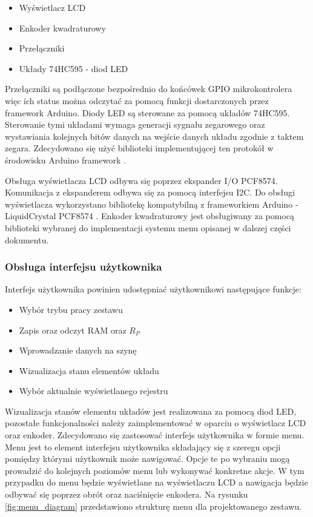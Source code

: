 \documentclass[../main.tex]{subfiles}
\begin{document}
    \begin{itemize}
        \item Wyświetlacz LCD
        \item Enkoder kwadraturowy
        \item Przełączniki
        \item Układy 74HC595 - diod LED
    \end{itemize}
    Przełączniki są podłączone bezpośrednio do końcówek GPIO mikrokontrolera więc ich status można odczytać za pomocą funkcji
    dostarczonych przez framework Arduino. Diody LED są sterowane za pomocą układów 74HC595. Sterowanie tymi układami wymaga 
    generacji sygnału zegarowego oraz wystawiania kolejnych bitów danych na wejście danych układu zgodnie z taktem zegara.
    Zdecydowano się użyć biblioteki implementującej ten protokół w środowisku Arduino framework \cite{arduino_74hc595}.

    Obsługa wyświetlacza LCD odbywa się poprzez ekspander I/O PCF8574. Komunikacja z ekspanderem odbywa się za pomocą interfejsu I2C.
    Do obsługi wyświetlacza wykorzystano bibliotekę kompatybilną z frameworkiem Arduino - LiquidCrystal PCF8574 \cite{lcd_pcf8574}. 
    Enkoder kwadraturowy jest obsługiwany za pomocą biblioteki wybranej do implementacji systemu menu opisanej w dalszej części dokumentu.

    \subsubsection{Obsługa interfejsu użytkownika}
    Interfejs użytkownika powinien udostępniać użytkownikowi następujące funkcje:
    \begin{itemize}
        \item Wybór trybu pracy zestawu
        \item Zapis oraz odczyt RAM oraz $R_P$
        \item Wprowadzanie danych na szynę
        \item Wizualizacja stanu elementów układu
        \item Wybór aktualnie wyświetlanego rejestru
    \end{itemize}
    Wizualizacja stanów elementu układów jest realizowana za pomocą diod LED, pozostałe funkcjonalności należy zaimplementować w oparciu
    o wyświetlacz LCD oraz enkoder. Zdecydowano się  zastosować interfejs użytkownika w formie menu. Menu jest to element interfejsu 
    użytkownika składający się z szeregu opcji pomiędzy 
    którymi użytkownik może nawigować. Opcje te po wybraniu mogą prowadzić do kolejnych poziomów menu lub wykonywać konkretne akcje.
    W tym przypadku do menu będzie wyświetlane na wyświetlaczu LCD a nawigacja będzie odbywać się poprzez obrót oraz naciśnięcie enkodera.
    Na rysunku \ref{fig:menu_diagram} przedstawiono strukturę menu dla projektowanego zestawu.
\end{document}

